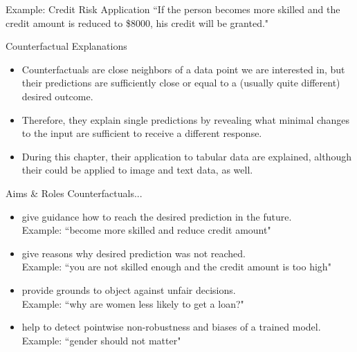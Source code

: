 \documentclass[11pt,compress,t,notes=noshow, xcolor=table]{beamer}
\begin{document}
\begin{vbframe}{Example: Credit Risk Application}
	``If the person becomes more skilled and the credit amount is reduced to \$8000, his credit will be granted."  \\[0.2cm]
	
\end{vbframe}

\begin{vbframe}{Counterfactual Explanations}
	\begin{itemize}
		\item Counterfactuals are close neighbors of a data point we are interested in, but their predictions are sufficiently close or equal to a (usually quite different) desired outcome. 
		\item Therefore, they explain single predictions by revealing what minimal changes to the input are sufficient to receive a different response. 
		\item During this chapter, their application to tabular data are explained, although their could be applied to image and text data, as well. 
	\end{itemize}
\end{vbframe}

\begin{vbframe}{Aims \& Roles}
	Counterfactuals...
	\begin{itemize}
		\itemsep1.5em
		\item give guidance how to reach the desired prediction in the future.\\
		Example:  ``become more skilled and reduce credit amount"
		\item give reasons why desired prediction was not reached. \\
		Example:  ``you are not skilled enough and the credit amount is too high"
		\item provide grounds to object against unfair decisions. \\
		Example:  ``why are women less likely to get a loan?"
		\item help to detect pointwise non-robustness and biases of a trained model. \\
		Example:  ``gender should not matter" 
	\end{itemize}
\end{vbframe}
\end{document}
